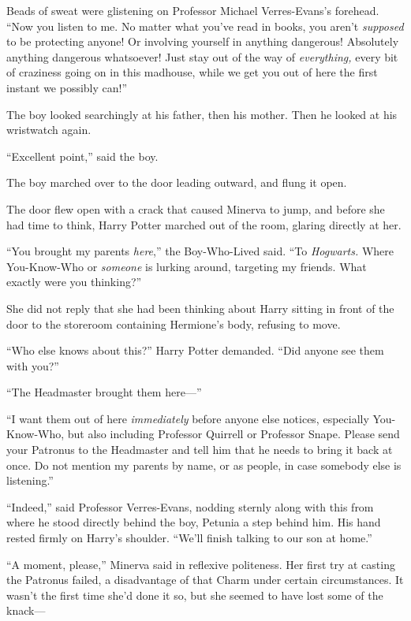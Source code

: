 Beads of sweat were glistening on Professor Michael Verres-Evans’s forehead. “Now you listen to me. No matter what you’ve read in books, you aren’t \emph{supposed} to be protecting anyone! Or involving yourself in anything dangerous! Absolutely anything dangerous whatsoever! Just stay out of the way of \emph{everything,} every bit of craziness going on in this madhouse, while we get you out of here the first instant we possibly can!”

The boy looked searchingly at his father, then his mother. Then he looked at his wristwatch again.

“Excellent point,” said the boy.

The boy marched over to the door leading outward, and flung it open.

\later

The door flew open with a crack that caused Minerva to jump,
and before she had time to think, Harry Potter marched out of the room, glaring directly at her.

“You brought my parents \emph{here},” the Boy-Who-Lived said. “To \emph{Hogwarts.} Where You-Know-Who or \emph{someone} is lurking around, targeting my friends. What exactly were you thinking?”

She did not reply that she had been thinking about Harry sitting in front of the door to the storeroom containing Hermione’s body, refusing to move.

“Who else knows about this?” Harry Potter demanded. “Did anyone see them with you?”

“The Headmaster brought them here—”

“I want them out of here \emph{immediately} before anyone else notices, especially You-Know-Who, but also including Professor Quirrell or Professor Snape. Please send your Patronus to the Headmaster and tell him that he needs to bring it back at once. Do not mention my parents by name, or as people, in case somebody else is listening.”

“Indeed,” said Professor Verres-Evans, nodding sternly along with this from where he stood directly behind the boy, Petunia a step behind him. His hand rested firmly on Harry’s shoulder. “We’ll finish talking to our son at home.”

“A moment, please,” Minerva said in reflexive politeness. Her first try at casting the Patronus failed, a disadvantage of that Charm under certain circumstances. It wasn’t the first time she’d done it so, but she seemed to have lost some of the knack—

